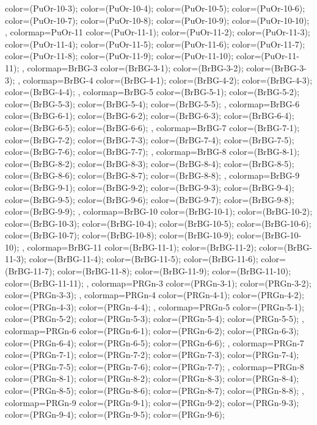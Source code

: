 {{color=(PuOr-10-3);
color=(PuOr-10-4);
color=(PuOr-10-5);
color=(PuOr-10-6);
color=(PuOr-10-7);
color=(PuOr-10-8);
color=(PuOr-10-9);
color=(PuOr-10-10);
},
colormap={PuOr-11}{
color=(PuOr-11-1);
color=(PuOr-11-2);
color=(PuOr-11-3);
color=(PuOr-11-4);
color=(PuOr-11-5);
color=(PuOr-11-6);
color=(PuOr-11-7);
color=(PuOr-11-8);
color=(PuOr-11-9);
color=(PuOr-11-10);
color=(PuOr-11-11);
},
colormap={BrBG-3}{
color=(BrBG-3-1);
color=(BrBG-3-2);
color=(BrBG-3-3);
},
colormap={BrBG-4}{
color=(BrBG-4-1);
color=(BrBG-4-2);
color=(BrBG-4-3);
color=(BrBG-4-4);
},
colormap={BrBG-5}{
color=(BrBG-5-1);
color=(BrBG-5-2);
color=(BrBG-5-3);
color=(BrBG-5-4);
color=(BrBG-5-5);
},
colormap={BrBG-6}{
color=(BrBG-6-1);
color=(BrBG-6-2);
color=(BrBG-6-3);
color=(BrBG-6-4);
color=(BrBG-6-5);
color=(BrBG-6-6);
},
colormap={BrBG-7}{
color=(BrBG-7-1);
color=(BrBG-7-2);
color=(BrBG-7-3);
color=(BrBG-7-4);
color=(BrBG-7-5);
color=(BrBG-7-6);
color=(BrBG-7-7);
},
colormap={BrBG-8}{
color=(BrBG-8-1);
color=(BrBG-8-2);
color=(BrBG-8-3);
color=(BrBG-8-4);
color=(BrBG-8-5);
color=(BrBG-8-6);
color=(BrBG-8-7);
color=(BrBG-8-8);
},
colormap={BrBG-9}{
color=(BrBG-9-1);
color=(BrBG-9-2);
color=(BrBG-9-3);
color=(BrBG-9-4);
color=(BrBG-9-5);
color=(BrBG-9-6);
color=(BrBG-9-7);
color=(BrBG-9-8);
color=(BrBG-9-9);
},
colormap={BrBG-10}{
color=(BrBG-10-1);
color=(BrBG-10-2);
color=(BrBG-10-3);
color=(BrBG-10-4);
color=(BrBG-10-5);
color=(BrBG-10-6);
color=(BrBG-10-7);
color=(BrBG-10-8);
color=(BrBG-10-9);
color=(BrBG-10-10);
},
colormap={BrBG-11}{
color=(BrBG-11-1);
color=(BrBG-11-2);
color=(BrBG-11-3);
color=(BrBG-11-4);
color=(BrBG-11-5);
color=(BrBG-11-6);
color=(BrBG-11-7);
color=(BrBG-11-8);
color=(BrBG-11-9);
color=(BrBG-11-10);
color=(BrBG-11-11);
},
colormap={PRGn-3}{
color=(PRGn-3-1);
color=(PRGn-3-2);
color=(PRGn-3-3);
},
colormap={PRGn-4}{
color=(PRGn-4-1);
color=(PRGn-4-2);
color=(PRGn-4-3);
color=(PRGn-4-4);
},
colormap={PRGn-5}{
color=(PRGn-5-1);
color=(PRGn-5-2);
color=(PRGn-5-3);
color=(PRGn-5-4);
color=(PRGn-5-5);
},
colormap={PRGn-6}{
color=(PRGn-6-1);
color=(PRGn-6-2);
color=(PRGn-6-3);
color=(PRGn-6-4);
color=(PRGn-6-5);
color=(PRGn-6-6);
},
colormap={PRGn-7}{
color=(PRGn-7-1);
color=(PRGn-7-2);
color=(PRGn-7-3);
color=(PRGn-7-4);
color=(PRGn-7-5);
color=(PRGn-7-6);
color=(PRGn-7-7);
},
colormap={PRGn-8}{
color=(PRGn-8-1);
color=(PRGn-8-2);
color=(PRGn-8-3);
color=(PRGn-8-4);
color=(PRGn-8-5);
color=(PRGn-8-6);
color=(PRGn-8-7);
color=(PRGn-8-8);
},
colormap={PRGn-9}{
color=(PRGn-9-1);
color=(PRGn-9-2);
color=(PRGn-9-3);
color=(PRGn-9-4);
color=(PRGn-9-5);
color=(PRGn-9-6);
}}
